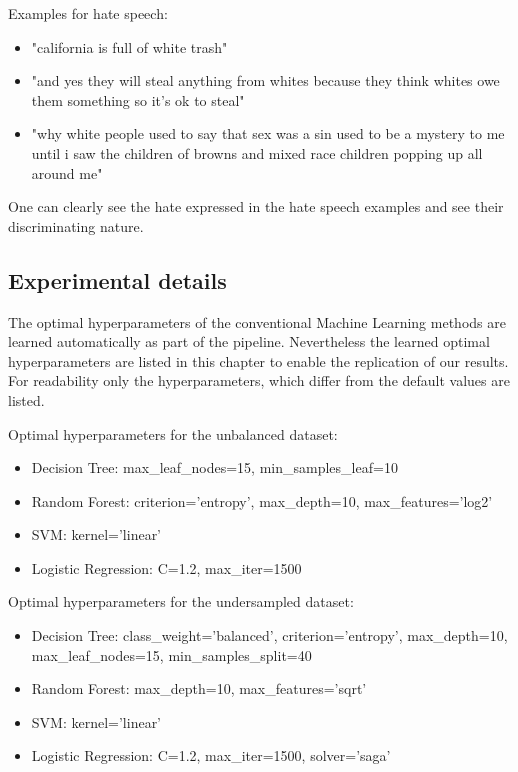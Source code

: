 \noindent
Examples for hate speech:
\begin{itemize}
    \item "california is full of white trash"
    \item "and yes they will steal anything from whites because they think whites owe them something so it's ok to steal"
    \item "why white people used to say that sex was a sin used to be a mystery to me until i saw the children of browns and mixed race children popping up all around me"
\end{itemize}

One can clearly see the hate expressed in the hate speech examples and see their discriminating nature.

\subsection{Experimental details}


The optimal hyperparameters of the conventional Machine Learning methods are learned automatically as part of the pipeline. Nevertheless the learned optimal hyperparameters are listed in this chapter to enable the replication of our results. For readability only the hyperparameters, which differ from the default values are listed.

Optimal hyperparameters for the unbalanced dataset:
\begin{itemize}
	\item Decision Tree: max\_leaf\_nodes=15, min\_samples\_leaf=10
	\item Random Forest: criterion='entropy', max\_depth=10, max\_features='log2'
	\item SVM: kernel='linear'
	\item Logistic Regression: C=1.2, max\_iter=1500
\end{itemize}

Optimal hyperparameters for the undersampled dataset:
\begin{itemize}
	\item Decision Tree: class\_weight='balanced', criterion='entropy', max\_depth=10, max\_leaf\_nodes=15, min\_samples\_split=40
	\item Random Forest: max\_depth=10, max\_features='sqrt'
	\item SVM: kernel='linear'
	\item Logistic Regression: C=1.2, max\_iter=1500, solver='saga'
\end{itemize}

